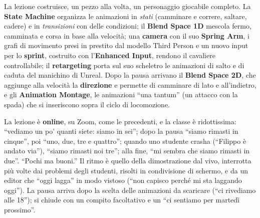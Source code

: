 La lezione costruisce, un pezzo alla volta, un personaggio giocabile completo. La
\textbf{State Machine} organizza le animazioni in \emph{stati} (camminare e correre,
saltare, cadere) e in \emph{transizioni} con delle condizioni; il \textbf{Blend Space
1D} mescola fermo, camminata e corsa in base alla velocità; una \textbf{camera} con il
suo \textbf{Spring Arm}, i grafi di movimento presi in prestito dal modello Third Person
e un nuovo input per lo \textbf{sprint}, costruito con l'\textbf{Enhanced Input},
rendono il cavaliere controllabile; il \textbf{retargeting} porta sul suo scheletro le
animazioni di salto e di caduta del manichino di Unreal. Dopo la pausa arrivano il
\textbf{Blend Space 2D}, che aggiunge alla velocità la \textbf{direzione} e permette di
camminare di lato e all'indietro, e gli \textbf{Animation Montage}, le animazioni
``una tantum'' (un attacco con la spada) che si inseriscono sopra il ciclo di
locomozione.

La lezione è \textbf{online}, su Zoom, come le precedenti, e la classe è ridottissima:
``vediamo un po' quanti siete: siamo in sei''; dopo la pausa ``siamo rimasti in
cinque'', poi ``uno, due, tre e quattro''; quando uno studente crasha (``Filippo è andato
via''), ``siamo rimasti noi tre''; alla fine, ``mi sembra che siamo rimasti in due''.
``Pochi ma buoni.'' Il ritmo è quello della dimostrazione dal vivo, interrotta più volte
dai problemi degli studenti, risolti in condivisione di schermo, e da un editor che
``oggi lagga'' in modo vistoso (``non capisco perché mi sta laggando oggi''). La pausa
arriva dopo la scelta delle animazioni da scaricare (``ci rivediamo alle 18''); si
chiude con un compito facoltativo e un ``ci sentiamo per martedì prossimo''.

